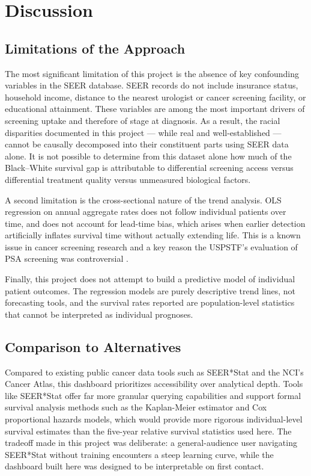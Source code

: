 \documentclass[12pt]{article}
\begin{document}
\section{Discussion}

\subsection{Limitations of the Approach}

The most significant limitation of this project is the absence of key confounding
variables in the SEER database. SEER records do not include insurance status, household
income, distance to the nearest urologist or cancer screening facility, or educational
attainment. These variables are among the most important drivers of screening uptake
and therefore of stage at diagnosis. As a result, the racial disparities documented
in this project --- while real and well-established --- cannot be causally decomposed
into their constituent parts using SEER data alone. It is not possible to determine
from this dataset alone how much of the Black--White survival gap is attributable to
differential screening access versus differential treatment quality versus unmeasured
biological factors.

A second limitation is the cross-sectional nature of the trend analysis. OLS
regression on annual aggregate rates does not follow individual patients over time,
and does not account for lead-time bias, which arises when earlier detection
artificially inflates survival time without actually extending life. This is a known
issue in cancer screening research and a key reason the USPSTF's evaluation of PSA
screening was controversial \cite{uspstf2012, uspstf2018}.

Finally, this project does not attempt to build a predictive model of individual
patient outcomes. The regression models are purely descriptive trend lines, not
forecasting tools, and the survival rates reported are population-level statistics
that cannot be interpreted as individual prognoses.

\subsection{Comparison to Alternatives}

Compared to existing public cancer data tools such as SEER*Stat and the NCI's Cancer
Atlas, this dashboard prioritizes accessibility over analytical depth. Tools like
SEER*Stat offer far more granular querying capabilities and support formal survival
analysis methods such as the Kaplan-Meier estimator and Cox proportional hazards
models, which would provide more rigorous individual-level survival estimates than
the five-year relative survival statistics used here. The tradeoff made in this
project was deliberate: a general-audience user navigating SEER*Stat without training
encounters a steep learning curve, while the dashboard built here was designed to be
interpretable on first contact.
\end{document}
